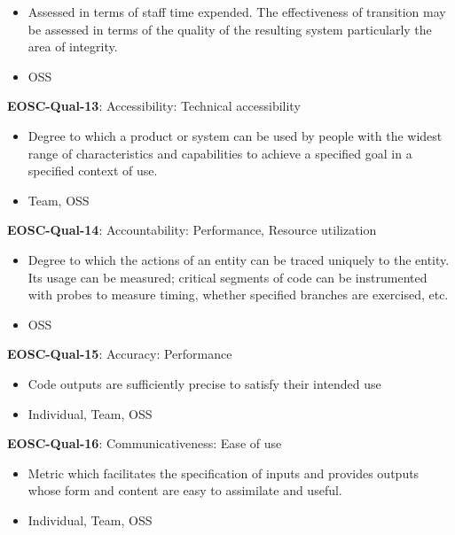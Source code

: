 \begin{itemize}
    \item Assessed in terms of staff time expended. The effectiveness of transition may be assessed in terms of the quality of the resulting system particularly the area of integrity. \cite{iso_25010_2011_2017,gillies_modelling_1992}
    \item OSS
\end{itemize}

\textbf{EOSC-Qual-13}: Accessibility: Technical accessibility

\begin{itemize}
    \item Degree to which a product or system can be used by people with the widest range of characteristics and
capabilities to achieve a specified goal in a specified context of use. \cite{iso_25010_2011_2017,boehm_quantitative_1976}
    \item Team, OSS
\end{itemize}

\textbf{EOSC-Qual-14}: Accountability: Performance, Resource utilization

\begin{itemize}
    \item Degree to which the actions of an entity can be traced uniquely to the entity. Its usage can be measured; critical segments of code can be instrumented with probes to measure timing, whether specified branches are exercised, etc. \cite{iso_25010_2011_2017,boehm_quantitative_1976}
    \item OSS
\end{itemize}

\textbf{EOSC-Qual-15}: Accuracy: Performance

\begin{itemize}
    \item Code outputs are sufficiently precise to satisfy their intended use \cite{boehm_quantitative_1976}
    \item Individual, Team, OSS
\end{itemize}

\textbf{EOSC-Qual-16}: Communicativeness: Ease of use

\begin{itemize}
    \item Metric which facilitates the specification of inputs and provides outputs whose form and content are easy to assimilate and useful. \cite{boehm_quantitative_1976,raymond_software_2013}
    \item Individual, Team, OSS
\end{itemize}

